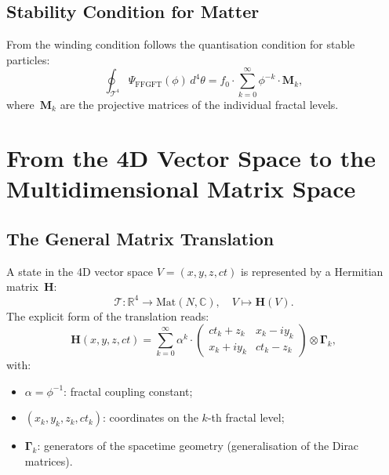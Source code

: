 \subsection{Stability Condition for Matter}

From the winding condition follows the quantisation condition for stable particles:
\begin{equation}
  \oint_{\mathcal{T}^4}
    \Psi_{\text{FFGFT}}(\phi)\,d^4\theta
  = f_0 \cdot \sum_{k=0}^{\infty} \phi^{-k} \cdot \mathbf{M}_k,
\end{equation}
where~$\mathbf{M}_k$ are the projective matrices of the individual
fractal levels.

\section{From the 4D Vector Space to the Multidimensional Matrix Space}

\subsection{The General Matrix Translation}

A state in the 4D vector space $V = (x,y,z,ct)$ is represented by a
Hermitian matrix~$\mathbf{H}$:
\begin{equation}
  \mathcal{T}: \mathbb{R}^4 \to \mathrm{Mat}(N,\mathbb{C}),\quad
  V \mapsto \mathbf{H}(V).
\end{equation}
The explicit form of the translation reads:
\begin{equation}
  \mathbf{H}(x,y,z,ct)
  = \sum_{k=0}^{\infty} \alpha^k \cdot
    \begin{pmatrix}
      ct_k + z_k   & x_k - iy_k \\
      x_k + iy_k   & ct_k - z_k
    \end{pmatrix}
    \otimes \symbf{\Gamma}_k,
\end{equation}
with:
\begin{itemize}
  \item $\alpha = \phi^{-1}$: fractal coupling constant;
  \item $(x_k, y_k, z_k, ct_k)$: coordinates on the $k$-th fractal level;
  \item $\symbf{\Gamma}_k$: generators of the spacetime geometry
        (generalisation of the Dirac matrices).
\end{itemize}

